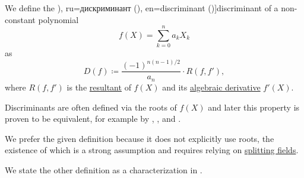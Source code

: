\begin{definition}\label{def:discriminant}
  We define the \term[bg=дискриминанта (\cite[215]{Обрешков1962ВисшаАлгебра}), ru=дискриминант (\cite[141]{Винберг2014КурсАлгебры}), en=discriminant (\cite[223]{Rotman2015AdvancedModernAlgebraPart1})]{discriminant} of a non-constant polynomial
  \begin{equation*}
    f(X) = \sum_{k=0}^n a_k X_k
  \end{equation*}
  as
  \begin{equation*}
    D(f) \coloneqq \frac {(-1)^{n(n-1)/2}} {a_n} \cdot R(f, f'),
  \end{equation*}
  where \( R(f, f') \) is the \hyperref[def:resultant]{resultant} of \( f(X) \) and its \hyperref[def:algebraic_derivative]{algebraic derivative} \( f'(X) \).
\end{definition}
\begin{comments}
  \item Discriminants are often defined via the roots of \( f(X) \) and later this property is proven to be equivalent, for example by
  ,
  ,
   and
  .

  We prefer the given definition because it does not explicitly use roots, the existence of which is a strong assumption and requires relying on \hyperref[def:splitting_field]{splitting fields}.

  We state the other definition as a characterization in .
\end{comments}

